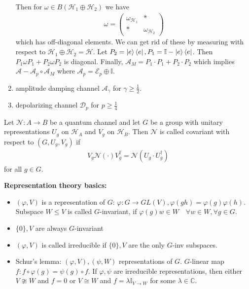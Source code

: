 \documentclass[../../note.tex]{subfiles}
\begin{document}
\begin{enumerate}
    Then for $\omega \in B(\mathcal{H}_1 \oplus \mathcal{H}_2)$ we have 
    \begin{align}
        \omega = \begin{pmatrix}
        \omega_{\mathcal{H}_1} & * \\
        * & \omega_{\mathcal{H}_2}
        \end{pmatrix}
    \end{align}
    which has off-diagonal elements. We can get rid of these by measuring with respect to $\mathcal{H}_1 \oplus \mathcal{H}_2 = \mathcal{H}$. Let $P_2 = \ket{e}\bra{e}, P_1 = \mathbb{I}-\ket{e}\bra{e}$. Then $P_1 \omega P_1 + P_2 \omega P_2$ is diagonal. Finally, $\mathcal{A}_M = P_1 \cdot P_1 + P_2 \cdot P_2$ which implies $\mathcal{A}- \mathcal{A}_p \circ \mathcal{A}_M$ where $\mathcal{A}_p = \mathcal{E}_p \oplus \mathbb{I}$. 
    \item amplitude damping channel $\mathcal{A}_{\gamma}$ for $\gamma \geq \frac{1}{2}$. 
    \item depolarizing channel $\mathcal{D}_p$ for $p \geq \frac{1}{4}$
\end{enumerate}

\begin{definition}
Let $\mathcal{N}: A \rightarrow B$ be a quantum channel and let $G$ be a group with unitary representations $U_{g}$ on $\mathcal{H}_A$ and $V_{g}$ on $\mathcal{H}_B$. Then $\mathcal{N}$ is called covariant with respect to $(G,U_g,V_g)$ if 
\begin{align}
    V_{g} \mathcal{N}(\cdot) V_g^{\dagger} = \mathcal{N}(U_g \cdot U_g^{\dagger})
\end{align}
for all $g\in G$.
\end{definition}

\noindent \textbf{Representation theory basics:}
\begin{itemize}
    \item $(\varphi,V)$ is a representation of $G$: $\varphi: G \rightarrow GL(V), \varphi(gh)=\varphi(g) \varphi(h)$. Subspace $W\leq V$ is called $G$-invariant, if $\varphi (g) w \in W \quad \forall w \in W, \forall g \in G$.
    \item $\{0\},V$ are always $G$-invariant
    \item $(\varphi, V)$ is called irreducible if $\{0\},V$ are the only $G$-inv subspaces.
    \item Schur's lemma: $(\varphi,V), (\psi,W)$ representations of $G$. $G$-linear map $f: f \circ \varphi(g)=\psi(g) \circ f$. If $\varphi,\psi$ are irreducible representations, then either $V \ncong W$ and $f=0$ or $V\cong W$ and $f=\lambda \mathbb{I}_{V\rightarrow W}$ for some $\lambda \in \mathbb{C}.$
\end{itemize}
\end{document}
